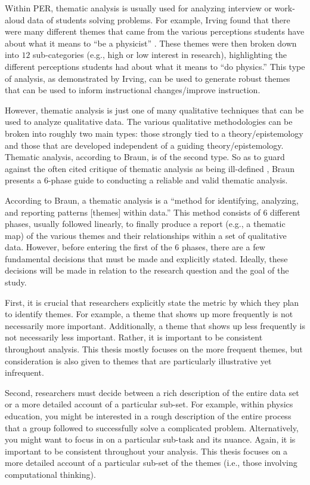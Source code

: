 \documentclass{msuphddissertation}
\begin{document}
\begin{doublespace}
Within PER, thematic analysis is usually used for analyzing interview or work-aloud data of students solving problems.  For example, Irving found that there were many different themes that came from the various perceptions students have about what it means to ``be a physicist'' \cite{Irving2016}.  These themes were then broken down into $12$ sub-categories (e.g., high or low interest in research), highlighting the different perceptions students had about what it means to ``do physics.''  This type of analysis, as demonstrated by Irving, can be used to generate robust themes that can be used to inform instructional changes/improve instruction.

However, thematic analysis is just one of many qualitative techniques that can be used to analyze qualitative data.  The various qualitative methodologies can be broken into roughly two main types: those strongly tied to a theory/epistemology and those that are developed independent of a guiding theory/epistemology.  Thematic analysis, according to Braun, is of the second type.  So as to guard against the often cited critique of thematic analysis as being ill-defined \cite{Antaki2002}, Braun presents a 6-phase guide to conducting a reliable and valid thematic analysis.

According to Braun, a thematic analysis is a ``method for identifying, analyzing, and reporting patterns [themes] within data.''  This method consists of $6$ different phases, usually followed linearly, to finally produce a report (e.g., a thematic map) of the various themes and their relationships within a set of qualitative data.  However, before entering the first of the $6$ phases, there are a few fundamental decisions that must be made and explicitly stated.  Ideally, these decisions will be made in relation to the research question and the goal of the study.

First, it is crucial that researchers explicitly state the metric by which they plan to identify themes.  For example, a theme that shows up more frequently is not necessarily more important.  Additionally, a theme that shows up less frequently is not necessarily less important.  Rather, it is important to be consistent throughout analysis.  This thesis mostly focuses on the more frequent themes, but consideration is also given to themes that are particularly illustrative yet infrequent.

Second, researchers must decide between a rich description of the entire data set or a more detailed account of a particular sub-set.  For example, within physics education, you might be interested in a rough description of the entire process that a group followed to successfully solve a complicated problem.  Alternatively, you might want to focus in on a particular sub-task and its nuance.  Again, it is important to be consistent throughout your analysis.  This thesis focuses on a more detailed account of a particular sub-set of the themes (i.e., those involving computational thinking).


\end{doublespace}
\end{document}
